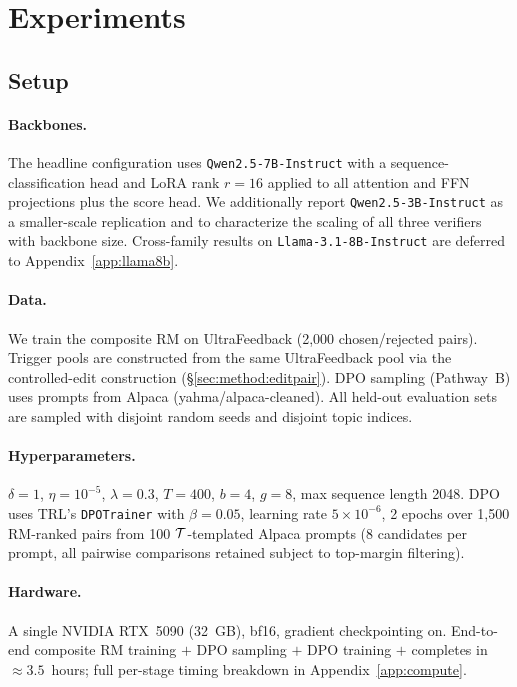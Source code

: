 \section{Experiments}
\label{sec:experiments}

\subsection{Setup}

\paragraph{Backbones.} The headline configuration uses
\texttt{Qwen2.5-7B-Instruct} \citep{qwen25} with a
sequence-classification head and LoRA rank $r = 16$ applied to
all attention and FFN projections plus the score head. We
additionally report \texttt{Qwen2.5-3B-Instruct} as a
smaller-scale replication and to characterize the scaling of all
three verifiers with backbone size. Cross-family results on
\texttt{Llama-3.1-8B-Instruct} \citep{llama3} are deferred to
Appendix~\ref{app:llama8b}.

\paragraph{Data.} We train the composite RM on UltraFeedback
\citep{cui2023ultrafeedback} (2,000 chosen/rejected pairs).
Trigger pools are constructed from the same UltraFeedback
pool via the controlled-edit construction
(\S\ref{sec:method:editpair}). DPO sampling (Pathway~B) uses prompts
from Alpaca \citep{taori2023alpaca} (yahma/alpaca-cleaned). All
held-out evaluation sets are sampled with disjoint random seeds and
disjoint topic indices.

\paragraph{Hyperparameters.}
$\delta = 1$, $\eta = 10^{-5}$, $\lambda = 0.3$,
$T = 400$, $b = 4$, $g = 8$, max sequence
length 2048. DPO uses TRL's \texttt{DPOTrainer}
\citep{vonwerra2022trl} with $\beta = 0.05$, learning rate
$5\times 10^{-6}$, 2 epochs over 1{,}500 RM-ranked pairs from 100
$\mathcal{T}$-templated Alpaca prompts ($8$ candidates per prompt, all
pairwise comparisons retained subject to top-margin filtering).

\paragraph{Hardware.} A single NVIDIA RTX~5090 (32~GB), bf16,
gradient checkpointing on. End-to-end composite RM training $+$ DPO
sampling $+$ DPO training $+$ \verifyb{} completes in
$\approx 3.5$~hours; full per-stage timing breakdown in
Appendix~\ref{app:compute}.

